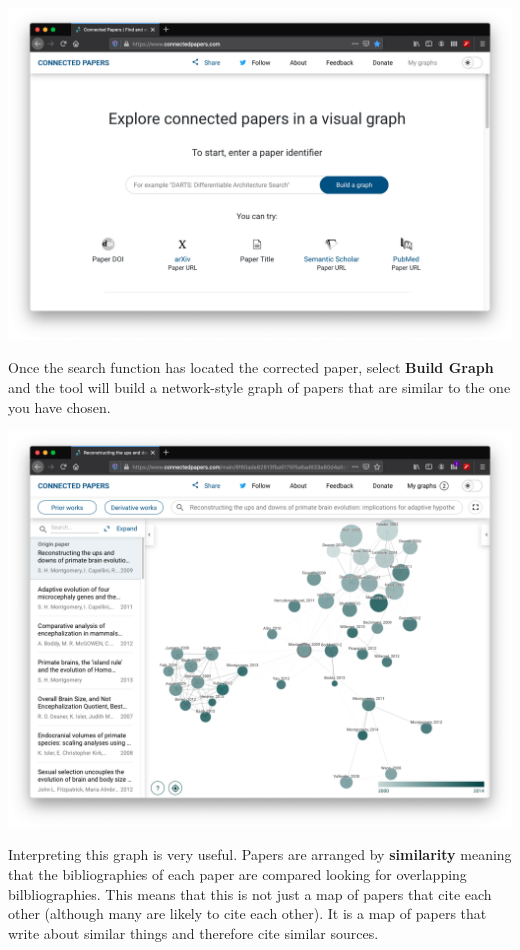 \documentclass[
]{book}
\begin{document}
\begin{center}\includegraphics[width=17.85in]{Images/Screens/CPhome} \end{center}

Once the search function has located the corrected paper, select \textbf{Build Graph} and the tool will build a network-style graph of papers that are similar to the one you have chosen.

\begin{center}\includegraphics[width=17.85in]{Images/Screens/CPmap} \end{center}

Interpreting this graph is very useful. Papers are arranged by \textbf{similarity} meaning that the bibliographies of each paper are compared looking for overlapping bilbliographies. This means that this is not just a map of papers that cite each other (although many are likely to cite each other). It is a map of papers that write about similar things and therefore cite similar sources.
\end{document}
